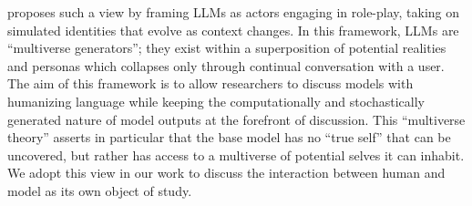 \citet{shanahan_role_2023} proposes such a view by framing LLMs as actors engaging in role-play, taking on simulated identities that evolve as context changes. In this framework, LLMs are ``multiverse generators''; they exist within a superposition of potential realities and personas which collapses only through continual conversation with a user. The aim of this framework is to allow researchers to discuss models with humanizing language while keeping the computationally and stochastically generated nature of model outputs at the forefront of discussion. This ``multiverse theory'' asserts in particular that the base model has no ``true self'' that can be uncovered, but rather has access to a multiverse of potential selves it can inhabit. We adopt this view in our work to discuss the interaction between human and model as its own object of study.



